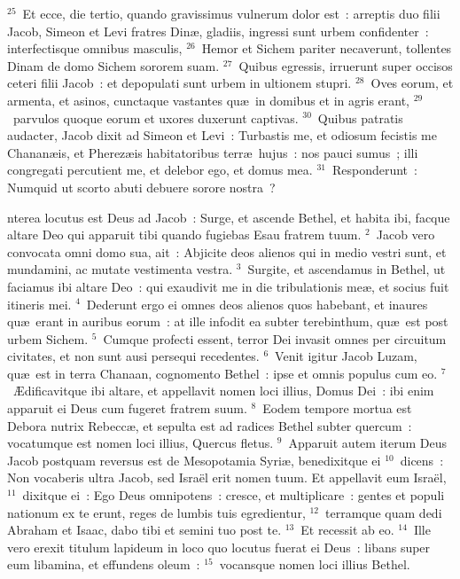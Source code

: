 ${}^{25}$~Et ecce, die tertio, quando gravissimus vulnerum dolor est~: arreptis duo filii Jacob, Simeon et Levi fratres Din\ae , gladiis, ingressi sunt urbem confidenter~: interfectisque omnibus masculis,
${}^{26}$~Hemor et Sichem pariter necaverunt, tollentes Dinam de domo Sichem sororem suam.
${}^{27}$~Quibus egressis, irruerunt super occisos ceteri filii Jacob~: et depopulati sunt urbem in ultionem stupri.
${}^{28}$~Oves eorum, et armenta, et asinos, cunctaque vastantes qu\ae\ in domibus et in agris erant,
${}^{29}$~parvulos quoque eorum et uxores duxerunt captivas.
${}^{30}$~Quibus patratis audacter, Jacob dixit ad Simeon et Levi~: Turbastis me, et odiosum fecistis me Chanan\ae is, et Pherez\ae is habitatoribus terr\ae\ hujus~: nos pauci sumus~; illi congregati percutient me, et delebor ego, et domus mea.
${}^{31}$~Responderunt~: Numquid ut scorto abuti debuere sorore nostra~?

\bchapter
{}nterea locutus est Deus ad Jacob~: Surge, et ascende Bethel, et habita ibi, facque altare Deo qui apparuit tibi quando fugiebas Esau fratrem tuum.
${}^{2}$~Jacob vero convocata omni domo sua, ait~: Abjicite deos alienos qui in medio vestri sunt, et mundamini, ac mutate vestimenta vestra.
${}^{3}$~Surgite, et ascendamus in Bethel, ut faciamus ibi altare Deo~: qui exaudivit me in die tribulationis me\ae , et socius fuit itineris mei.
${}^{4}$~Dederunt ergo ei omnes deos alienos quos habebant, et inaures qu\ae\ erant in auribus eorum~: at ille infodit ea subter terebinthum, qu\ae\ est post urbem Sichem.
${}^{5}$~Cumque profecti essent, terror Dei invasit omnes per circuitum civitates, et non sunt ausi persequi recedentes.
${}^{6}$~Venit igitur Jacob Luzam, qu\ae\ est in terra Chanaan, cognomento Bethel~: ipse et omnis populus cum eo.
${}^{7}$~\AE dificavitque ibi altare, et appellavit nomen loci illius, Domus Dei~: ibi enim apparuit ei Deus cum fugeret fratrem suum.
${}^{8}$~Eodem tempore mortua est Debora nutrix Rebecc\ae , et sepulta est ad radices Bethel subter quercum~: vocatumque est nomen loci illius, Quercus fletus.
${}^{9}$~Apparuit autem iterum Deus Jacob postquam reversus est de Mesopotamia Syri\ae , benedixitque ei
${}^{10}$~dicens~: Non vocaberis ultra Jacob, sed Isra\"el erit nomen tuum. Et appellavit eum Isra\"el,
${}^{11}$~dixitque ei~: Ego Deus omnipotens~: cresce, et multiplicare~: gentes et populi nationum ex te erunt, reges de lumbis tuis egredientur,
${}^{12}$~terramque quam dedi Abraham et Isaac, dabo tibi et semini tuo post te.
${}^{13}$~Et recessit ab eo.
${}^{14}$~Ille vero erexit titulum lapideum in loco quo locutus fuerat ei Deus~: libans super eum libamina, et effundens oleum~:
${}^{15}$~vocansque nomen loci illius Bethel.


